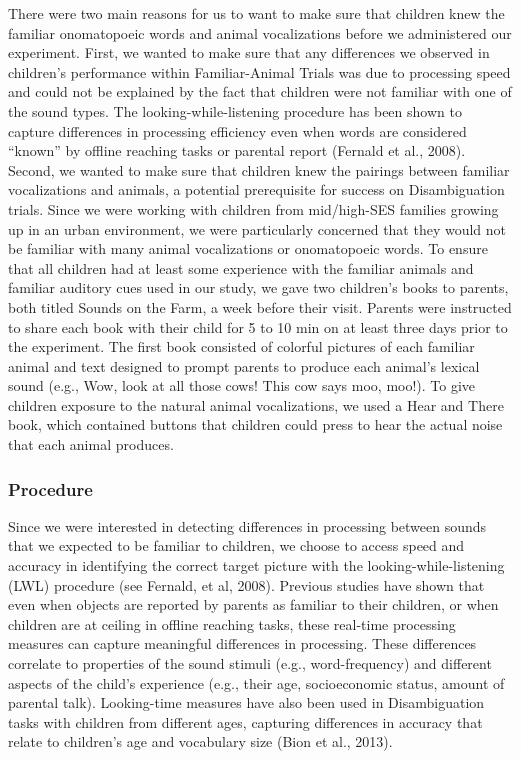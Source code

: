 \documentclass[english,floatsintext,man]{apa6}
\theoremstyle{definition}
\theoremstyle{definition}
\theoremstyle{definition}
\theoremstyle{remark}
\begin{document}
There were two main reasons for us to want to make sure that children
knew the familiar onomatopoeic words and animal vocalizations before we
administered our experiment. First, we wanted to make sure that any
differences we observed in children's performance within Familiar-Animal
Trials was due to processing speed and could not be explained by the
fact that children were not familiar with one of the sound types. The
looking-while-listening procedure has been shown to capture differences
in processing efficiency even when words are considered \enquote{known}
by offline reaching tasks or parental report (Fernald et al., 2008).
Second, we wanted to make sure that children knew the pairings between
familiar vocalizations and animals, a potential prerequisite for success
on Disambiguation trials. Since we were working with children from
mid/high-SES families growing up in an urban environment, we were
particularly concerned that they would not be familiar with many animal
vocalizations or onomatopoeic words. To ensure that all children had at
least some experience with the familiar animals and familiar auditory
cues used in our study, we gave two children's books to parents, both
titled Sounds on the Farm, a week before their visit. Parents were
instructed to share each book with their child for 5 to 10 min on at
least three days prior to the experiment. The first book consisted of
colorful pictures of each familiar animal and text designed to prompt
parents to produce each animal's lexical sound (e.g., Wow, look at all
those cows! This cow says moo, moo!). To give children exposure to the
natural animal vocalizations, we used a Hear and There book, which
contained buttons that children could press to hear the actual noise
that each animal produces.

\hypertarget{procedure}{%
\subsubsection{Procedure}\label{procedure}}

Since we were interested in detecting differences in processing between
sounds that we expected to be familiar to children, we choose to access
speed and accuracy in identifying the correct target picture with the
looking-while-listening (LWL) procedure (see Fernald, et al, 2008).
Previous studies have shown that even when objects are reported by
parents as familiar to their children, or when children are at ceiling
in offline reaching tasks, these real-time processing measures can
capture meaningful differences in processing. These differences
correlate to properties of the sound stimuli (e.g., word-frequency) and
different aspects of the child's experience (e.g., their age,
socioeconomic status, amount of parental talk). Looking-time measures
have also been used in Disambiguation tasks with children from different
ages, capturing differences in accuracy that relate to children's age
and vocabulary size (Bion et al., 2013).
\end{document}
